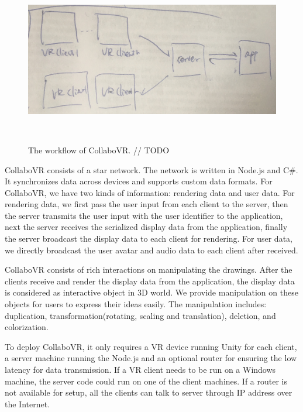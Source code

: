 \documentclass{sigchi}
\begin{document}
\begin{figure}[ht!]
 \centering
 \includegraphics[width=1.75\columnwidth]{workflow}
 \caption{The workflow of CollaboVR.
 // TODO
 }~\label{fig:workflow}
\end{figure}

CollaboVR consists of a star network. The network is written in Node.js and C\#. It synchronizes data across devices and supports custom data formats. For CollaboVR, we have two kinds of information: rendering data and user data. For rendering data, we first pass the user input from each client to the server, then the server transmits the user input with the user identifier to the application, next the server receives the serialized display data from the application, finally the server broadcast the display data to each client for rendering. For user data, we directly broadcast the user avatar and audio data to each client after received.

CollaboVR consists of rich interactions on manipulating the drawings. After the clients receive and render the display data from the application, the display data is considered as interactive object in 3D world. We provide manipulation on these objects for users to express their ideas easily. The manipulation includes: duplication, transformation(rotating, scaling and translation), deletion, and colorization.

To deploy CollaboVR, it only requires a VR device running Unity for each client, a server machine running the Node.js and an optional router for ensuring the low latency for data transmission. If a VR client needs to be run on a Windows machine, the server code could run on one of the client machines. If a router is not available for setup, all the clients can talk to server through IP address over the Internet. 
\end{document}
